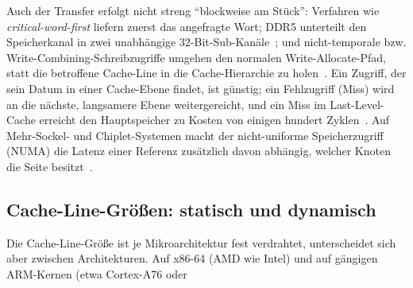 Auch der Transfer erfolgt nicht streng \enquote{blockweise am Stück}: Verfahren wie
\emph{critical-word-first} liefern zuerst das angefragte Wort; DDR5 unterteilt den Speicherkanal in
zwei unabhängige 32-Bit-Sub-Kanäle~\cite{micron_ddr5}; und nicht-temporale bzw.
Write-Combining-Schreibzugriffe umgehen den normalen Write-Allocate-Pfad, statt die betroffene
Cache-Line in die Cache-Hierarchie zu holen~\cite{intel_sdm}. Ein Zugriff, der sein Datum in einer
Cache-Ebene findet, ist günstig; ein Fehlzugriff (Miss) wird an die nächste, langsamere Ebene
weitergereicht, und ein Miss im Last-Level-Cache erreicht den Hauptspeicher zu Kosten von einigen
hundert Zyklen~\cite{hennessy2019architecture,drepper2007memory}. Auf Mehr-Sockel- und
Chiplet-Systemen macht der nicht-uniforme Speicherzugriff (NUMA) die Latenz einer Referenz
zusätzlich davon abhängig, welcher Knoten die Seite besitzt~\cite{drepper2007memory}.

\subsection{Cache-Line-Größen: statisch und dynamisch}\label{ssec:cache-line-sizes}
Die Cache-Line-Größe ist je Mikroarchitektur fest verdrahtet, unterscheidet sich aber zwischen
Architekturen. Auf x86-64 (AMD wie Intel) und auf gängigen ARM-Kernen (etwa Cortex-A76 oder
